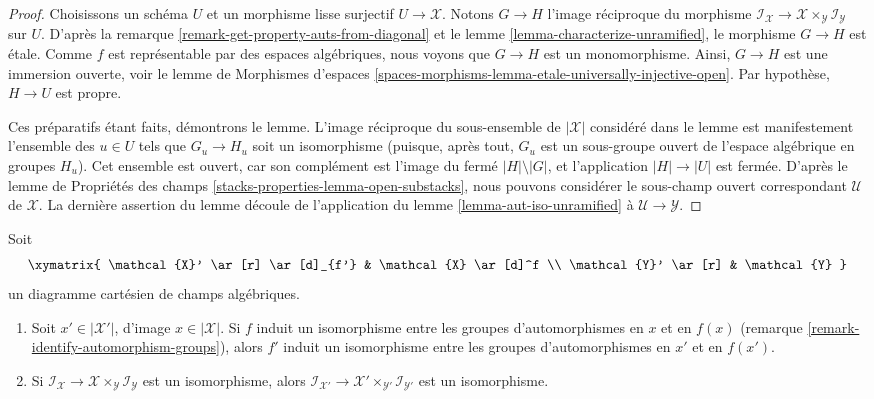 \begin{proof}
Choisissons un schéma $U$ et un morphisme lisse surjectif $U \to \mathcal{X}$.
Notons $G \to H$ l'image réciproque du morphisme
$\mathcal{I}_\mathcal{X} \to
\mathcal{X} \times_\mathcal{Y} \mathcal{I}_\mathcal{Y}$
sur $U$. D'après la remarque \ref{remark-get-property-auts-from-diagonal} et le
lemme \ref{lemma-characterize-unramified}, le morphisme
$G \to H$ est \'etale. Comme $f$ est représentable par des espaces algébriques,
nous voyons que $G \to H$ est un monomorphisme. Ainsi, $G \to H$ est une immersion
ouverte, voir
le lemme de Morphismes d'espaces
\ref{spaces-morphisms-lemma-etale-universally-injective-open}.
Par hypothèse, $H \to U$ est propre.

\medskip\noindent
Ces préparatifs étant faits, démontrons le lemme.
L'image réciproque du sous-ensemble de $|\mathcal{X}|$ considéré dans le lemme est
manifestement l'ensemble des $u \in U$ tels que $G_u \to H_u$ soit un isomorphisme
(puisque, après tout, $G_u$ est un sous-groupe ouvert de l'espace algébrique en groupes $H_u$).
Cet ensemble est ouvert, car son complément est
l'image du fermé $|H| \setminus |G|$, et l'application $|H| \to |U|$
est fermée. D'après le
lemme de Propriétés des champs \ref{stacks-properties-lemma-open-substacks},
nous pouvons considérer le sous-champ ouvert correspondant $\mathcal{U}$ de $\mathcal{X}$.
La dernière assertion du lemme découle de l'application du
lemme \ref{lemma-aut-iso-unramified}
à $\mathcal{U} \to \mathcal{Y}$.
\end{proof}

\begin{lemma}
\label{lemma-base-change-stabilizer-preserving}
Soit
$$
\xymatrix{
\mathcal{X}' \ar[r] \ar[d]_{f'} & \mathcal{X} \ar[d]^f \\
\mathcal{Y}' \ar[r] & \mathcal{Y}
}
$$
un diagramme cartésien de champs algébriques.
\begin{enumerate}
\item Soit $x' \in |\mathcal{X}'|$, d'image $x \in |\mathcal{X}|$.
Si $f$ induit un isomorphisme entre les groupes d'automorphismes en
$x$ et en $f(x)$ (remarque \ref{remark-identify-automorphism-groups}), alors
$f'$ induit un isomorphisme entre les groupes d'automorphismes en $x'$ et en $f(x')$.
\item Si $\mathcal{I}_\mathcal{X} \to
\mathcal{X} \times_\mathcal{Y} \mathcal{I}_\mathcal{Y}$ est un isomorphisme,
alors $\mathcal{I}_{\mathcal{X}'} \to
\mathcal{X}' \times_{\mathcal{Y}'} \mathcal{I}_{\mathcal{Y}'}$
est un isomorphisme.
\end{enumerate}
\end{lemma}

